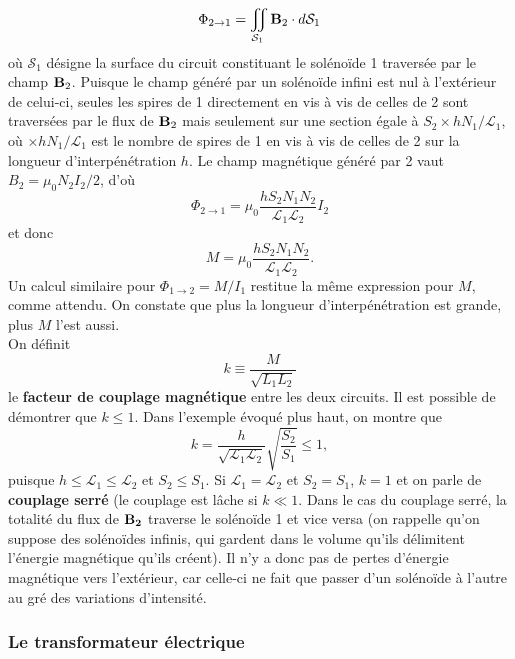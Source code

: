 \documentclass[11pt,a4paper]{report}
\begin{document}
\begin{equation}
	\Phi_{2\rightarrow 1} = \iint_{\mathcal{S}_1}\bold{B}_2\cdot d\bold{\mathcal{S}}_1
\end{equation}
où $\mathcal{S}_1$ désigne la surface du circuit constituant le solénoïde 1 traversée par le champ $\bold{B}_2$. Puisque le champ généré par un solénoïde infini est nul à l'extérieur de celui-ci, seules les spires de 1 directement en vis à vis de celles de 2 sont traversées par le flux de $\bold{B}_2$ mais seulement sur une section égale à $S_2 \times hN_1/\mathcal{L}_1$, où $\times hN_1/\mathcal{L}_1$ est le nombre de spires de 1 en vis à vis de celles de 2 sur la longueur d'interpénétration $h$. Le champ magnétique généré par 2 vaut $B_2 = \mu_0 N_2 I_2/\mathcal{2}$, d'où
\begin{equation}
	\Phi_{2\rightarrow 1} = \mu_0 \frac{hS_2 N_1 N_2}{\mathcal{L}_1\mathcal{L}_2}I_2
\end{equation}
et donc
\begin{equation}
	M = \mu_0 \frac{hS_2 N_1 N_2}{\mathcal{L}_1\mathcal{L}_2}.
\end{equation}
Un calcul similaire pour $\Phi_{1\rightarrow 2} = M/I_1$ restitue la même expression pour $M$, comme attendu. On constate que plus la longueur d'interpénétration est grande, plus $M$ l'est aussi.\\

On définit
\begin{equation}
	k \equiv \frac{M}{\sqrt{L_1L_2}}
\end{equation}
le \textbf{facteur de couplage magnétique} entre les deux circuits. Il est possible de démontrer que $k \leq 1$. Dans l'exemple évoqué plus haut, on montre que
\begin{equation}
	k = \frac{h}{\sqrt{\mathcal{L}_1\mathcal{L}_2}}\sqrt{\frac{S_2}{S_1}} \leq 1,
\end{equation}
puisque $h \leq \mathcal{L}_1 \leq \mathcal{L}_2$ et $S_2 \leq S_1$. Si $\mathcal{L}_1 = \mathcal{L}_2$ et $S_2 = S_1$, $k = 1$ et on parle de \textbf{couplage serré} (le couplage est lâche si $k \ll 1$. Dans le cas du couplage serré, la totalité du flux de $\bold{B_2}$ traverse le solénoïde 1 et vice versa (on rappelle qu'on suppose des solénoïdes infinis, qui gardent dans le volume qu'ils délimitent l'énergie magnétique qu'ils créent). Il n'y a donc pas de pertes d'énergie magnétique vers l'extérieur, car celle-ci ne fait que passer d'un solénoïde à l'autre au gré des variations d'intensité.

\newpage
\subsubsection{Le transformateur électrique}
\end{document}
